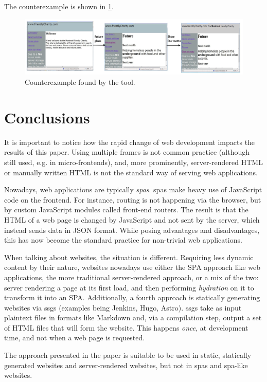 \documentclass[a4paper,10pt]{article}
\theoremstyle{plain} %
\theoremstyle{definition}
\theoremstyle{remark}
\begin{document}
The counterexample is shown in \cref{fig:counterexample}.

\begin{figure}[h]
  \includegraphics[width=\textwidth]{img/counterexample.png}
  \caption{Counterexample found by the tool.}
  \label{fig:counterexample}
\end{figure}

\section{Conclusions}

It is important to notice how the rapid change of web development impacts the results of this paper. Using multiple frames is not common practice (although still used, e.g. in micro-frontends), and, more prominently, server-rendered HTML or manually written HTML is not the standard way of serving web applications.

Nowadays, web applications are typically \textit{\glspl{spa}}. \glspl{spa} make heavy use of JavaScript code on the frontend. For instance, routing is not happening via the browser, but by custom JavaScript modules called front-end routers.  The result is that the HTML of a web page is changed by JavaScript and not sent by the server, which instead sends data in JSON format. While posing advantages and disadvantages, this has now become the standard practice for non-trivial web applications.

When talking about websites, the situation is different. Requiring less dynamic content by their nature, websites nowadays use either the SPA approach like web applications, the more traditional server-rendered approach, or a mix of the two: server rendering a page at its first load, and then performing \emph{hydration} on it to transform it into an SPA. Additionally, a fourth approach is statically generating websites via \glspl{ssg} (examples being Jenkins\cite{JenkinsWeb}, Hugo\cite{HugoWeb}, Astro\cite{AstroWeb}). \glspl{ssg} take as input plaintext files in formats like Markdown and, via a compilation step, output a set of HTML files that will form the website. This happens \emph{once}, at development time, and not when a web page is requested.

The approach presented in the paper is suitable to be used in static, statically generated websites and server-rendered websites, but not in \acrlong{spa}s and \gls{spa}-like websites.


\clearpage
\printbibliography
\end{document}
